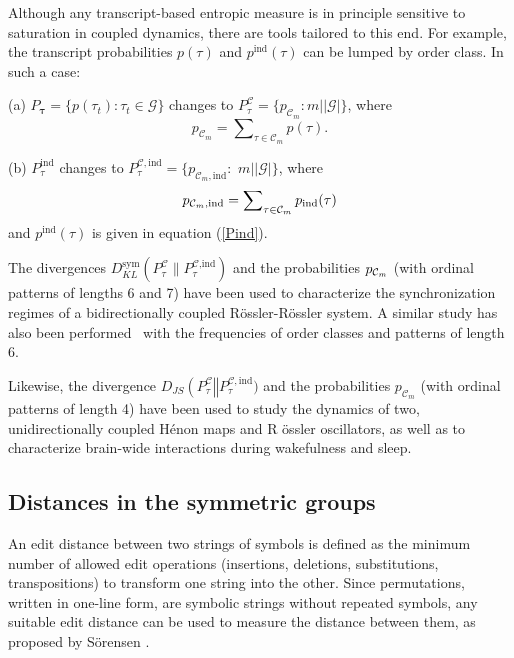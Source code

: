 \documentclass[%
 aip,
 amsmath,amssymb,
 reprint,%
]{revtex4-1}
\begin{document}
Although any transcript-based entropic measure is in principle sensitive to
saturation in coupled dynamics, there are tools tailored to this end. For
example, the transcript probabilities $p(\tau )$ and $p^{\mathrm{ind}}(\tau
) $ can be lumped by order class. In such a case:

(a) $P_{\mathbf{\tau }}=\{p(\tau _{t}):\tau _{t}\in \mathcal{G}\}$ changes
to $P_{\tau }^{\mathcal{C}}=\{p_{\mathcal{C}_{m}}:m|\left\vert \mathcal{G}%
\right\vert \}$, where 
\begin{equation}
p_{\mathcal{C}_{m}}=\sum\nolimits_{\tau \in \mathcal{C}_{m}}p(\tau ).
\label{p_C_m}
\end{equation}

(b) $P_{\tau }^{\mathrm{ind}}$ changes to $P_{\tau }^{\mathcal{C},\mathrm{ind%
}}=\{p_{\mathcal{C}_{m},\mathrm{ind}}:$ $m|\left\vert \mathcal{G}\right\vert
\}$, where 
\begin{equation}
p_{\mathcal{C}_{m},\mathrm{ind}}=\sum\nolimits_{\tau \in \mathcal{C}_{m}}p_{%
\mathrm{ind}}(\tau )  \label{p_C_m_ind}
\end{equation}%
and $p^{\mathrm{ind}}(\tau )$ is given in equation (\ref{Pind}).

The divergences $D_{KL}^{\mathrm{sym}}(P_{\tau }^{\mathcal{C}}\parallel
P_{\tau }^{\mathcal{C}\text{,}\mathrm{ind}})$ and the probabilities $p_{%
\mathcal{C}_{m}}$ (with ordinal patterns of lengths 6 and 7) have been used 
\cite{Monetti2009} to characterize the synchronization regimes of a
bidirectionally coupled R\"{o}ssler-R\"{o}ssler system. A similar study has
also been performed \cite{Bunk2013}\ with the frequencies of order classes and
patterns of length 6.

Likewise, the divergence $D_{JS}\left( P_{\tau }^{\mathcal{C}}\right\Vert
P_{\tau }^{\mathcal{C},\mathrm{ind}})$ and the probabilities $p_{\mathcal{C}%
_{m}}$ (with ordinal patterns of length 4) have been used \cite{Adams2025B}
to study the dynamics of two, unidirectionally coupled H\'{e}non maps and R%
\"{o}ssler oscillators, as well as to characterize brain-wide interactions
during wakefulness and sleep.



\subsection{Distances in the symmetric groups}

\label{sec61}

An edit distance between two strings of symbols is defined as the minimum
number of allowed edit operations (insertions, deletions, substitutions,
transpositions) to transform one string into the other. Since permutations,
written in one-line form, are symbolic strings without repeated symbols, any
suitable edit distance can be used to measure the distance between them, as
proposed by S\"{o}rensen \cite{Sorensen2007}.
\end{document}
